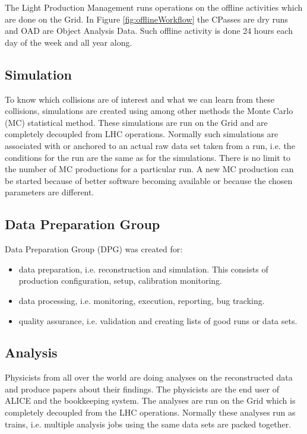 The Light Production Management runs operations on the offline activities which are done on the Grid. In Figure \ref{fig:offlineWorkflow} the CPasses are dry runs and OAD are Object Analysis Data. Such offline activity is done 24 hours each day of the week and all year along.


\subsection{Simulation}
To know which collisions are of interest and what we can learn from these collisions, simulations are created using among other methods the Monte Carlo (MC) statistical method. These simulations are run on the Grid and are completely decoupled from LHC operations. Normally such simulations are associated with or anchored to an actual raw data set taken from a run, i.e. the conditions for the run are the same as for the simulations. There is no limit to the number of MC productions for a particular run. A new MC production can be started because of better software becoming available or because the chosen parameters are different.


\subsection{Data Preparation Group}
Data Preparation Group (DPG) was created for:
\begin{itemize}
  \item data preparation, i.e. reconstruction and simulation. This consists of production configuration, setup, calibration monitoring.
  \item data processing, i.e. monitoring, execution, reporting, bug tracking.
  \item quality assurance, i.e. validation and creating lists of good runs or data sets.
\end{itemize}




\subsection{Analysis}
Physicists from all over the world are doing analyses on the reconstructed data and produce papers about their findings. The physicists are the end user of ALICE and the bookkeeping system. The analyses are run on the Grid which is completely decoupled from the LHC operations. Normally these analyses run as trains, i.e. multiple analysis jobs using the same data sets are packed together.



